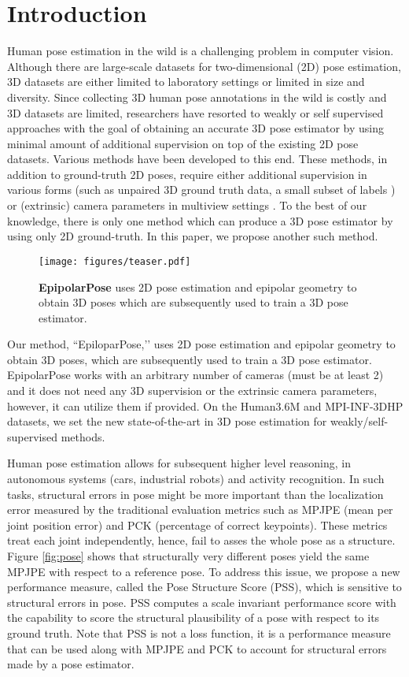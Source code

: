 \documentclass[10pt,twocolumn,letterpaper]{article}
\begin{document}
\section{Introduction}
\label{sec:intro}
Human pose estimation in the wild is a challenging problem in computer vision. Although there are large-scale datasets \cite{mpii,coco} for two-dimensional (2D) pose estimation, 3D datasets \cite{h36m, monocular3d} are either limited to laboratory settings or limited in size and diversity. Since collecting 3D human pose annotations in the wild is costly and 3D datasets are limited,  researchers have resorted to weakly or self supervised approaches with the goal of obtaining an accurate 3D pose estimator by using minimal amount of additional supervision on top of the existing 2D pose datasets. Various methods have been developed to this end. These methods, in addition to ground-truth 2D poses, require either additional supervision in various forms (such as unpaired 3D ground truth data\cite{tung2017}, a small subset of labels \cite{rhodin2018})  or (extrinsic) camera parameters in multiview settings \cite{pavlakos2017harvesting}. To the best of our knowledge, there is only one method \cite{drover2018} which can produce a 3D pose estimator by using only 2D ground-truth. In this paper, we propose another such method. 
\begin{figure}
\centering
\texttt{[image: figures/teaser.pdf]}
\caption{\textbf{EpipolarPose} uses 2D pose estimation and epipolar geometry to obtain 3D poses which are subsequently used to train a 3D pose estimator.}
\label{fig:teaser}
\end{figure}

Our method, ``EpiloparPose,’’ uses 2D pose estimation and epipolar geometry to obtain 3D poses, which are subsequently used to train a 3D pose estimator. EpipolarPose works with an arbitrary number of cameras (must be at least 2) and it does not need any 3D supervision or the extrinsic camera parameters, however,  it can utilize them if provided. On the Human3.6M \cite{h36m} and MPI-INF-3DHP \cite{monocular3d} datasets, we set the new state-of-the-art in 3D pose estimation for weakly/self-supervised methods. 

Human pose estimation allows for subsequent higher level reasoning, \eg in autonomous systems (cars, industrial robots) and activity recognition. In such tasks, structural errors in pose might be more important than the localization error measured by the traditional evaluation metrics such as MPJPE (mean per joint position error) and PCK (percentage of correct keypoints). These metrics treat each joint independently, hence, fail to asses the whole pose as a structure. Figure \ref{fig:pose} shows that structurally very different poses yield the same MPJPE with respect to a reference pose. To address this issue, we propose a new performance measure, called the Pose Structure Score (PSS), which is sensitive to structural errors in pose. PSS computes a scale invariant performance score with the capability to score the structural plausibility of a pose with respect to its ground truth. Note that PSS is not a loss function, it is a performance measure that can be used along with MPJPE and PCK to account for structural errors made by a pose estimator. 
\end{document}
